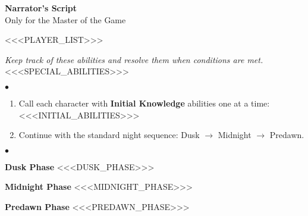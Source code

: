 \documentclass[12pt, a4paper]{article}
\newcommand{\sectiondivider}{%
  \par\noindent\hrulefill\quad\textbf{$\bullet$}\quad\hrulefill\par
}
\newcommand{\playerentry}[4]{\item \textbf{#1} -- Profession: #2, Role: #3, Alignment: #4}
\newcommand{\abilityentry}[3]{\item \textbf{#1} (#2): #3}
\begin{document}
\pagestyle{empty}

\begin{center}
    {\Huge\textbf{Narrator’s Script}}\\
    {\large Only for the Master of the Game}
    \vspace{1cm}
\end{center}

\begin{tcolorbox}[narrbox, title={Players Overview}]
<<<PLAYER_LIST>>>
\end{tcolorbox}

\vspace{0.2cm}

\begin{tcolorbox}[narrbox, title={Special Abilities}]
\textit{Keep track of these abilities and resolve them when conditions are met.}
<<<SPECIAL_ABILITIES>>>
\end{tcolorbox}

\vspace{0.2cm}

\begin{tcolorbox}[narrbox, title={First Night}]
\sectiondivider
\begin{enumerate}[leftmargin=*, itemsep=2pt]
    \item Call each character with \textbf{Initial Knowledge} abilities one at a time:
    <<<INITIAL_ABILITIES>>>
    \item Continue with the standard night sequence: Dusk $\rightarrow$ Midnight $\rightarrow$ Predawn.
\end{enumerate}
\end{tcolorbox}

\vspace{0.2cm}

\begin{tcolorbox}[narrbox, title={Regular Night Sequence}]
\sectiondivider

\textbf{Dusk Phase}
<<<DUSK_PHASE>>>

\vspace{0.2cm}
\textbf{Midnight Phase}
<<<MIDNIGHT_PHASE>>>

\vspace{0.2cm}
\textbf{Predawn Phase}
<<<PREDAWN_PHASE>>>
\end{tcolorbox}
\end{document}
